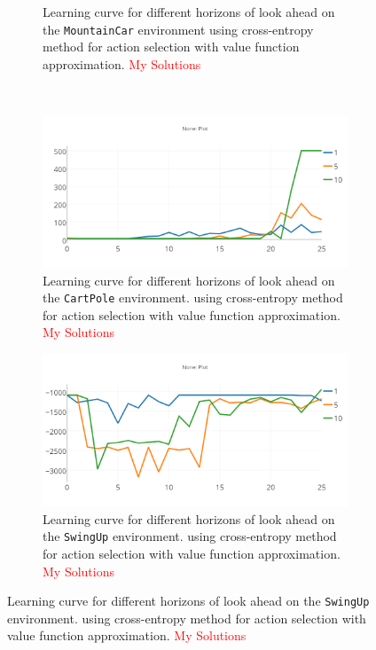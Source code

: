 \documentclass{article}
\begin{document}
\begin{enumerate}[(a)]
\begin{figure}[h!]
\begin{subfigure}{0.45\textwidth}
         \caption{Learning curve for different horizons of look ahead on the \texttt{MountainCar} environment
                using cross-entropy method for action selection with value function approximation. \textcolor{red}{My Solutions}}
    \end{subfigure}
\\
    \centering
    \begin{subfigure}{0.45\textwidth}
        \centering
        \includegraphics[width=\textwidth]{figures/part_3_b_c.png}
          \caption{Learning curve for different horizons of look ahead on the \texttt{CartPole} environment. 
                 using cross-entropy method for action selection with value function approximation. \textcolor{red}{My Solutions}}
    \end{subfigure}
    \hspace{0.2in}
    \begin{subfigure}{0.45\textwidth}
        \centering
        \includegraphics[width=\textwidth]{figures//part_3_b_d.png}
          \caption{Learning curve for different horizons of look ahead on the \texttt{SwingUp} environment. 
                 using cross-entropy method for action selection with value function approximation. \textcolor{red}{My Solutions}}
    \end{subfigure}
\end{figure}


\end{enumerate}
\end{document}
